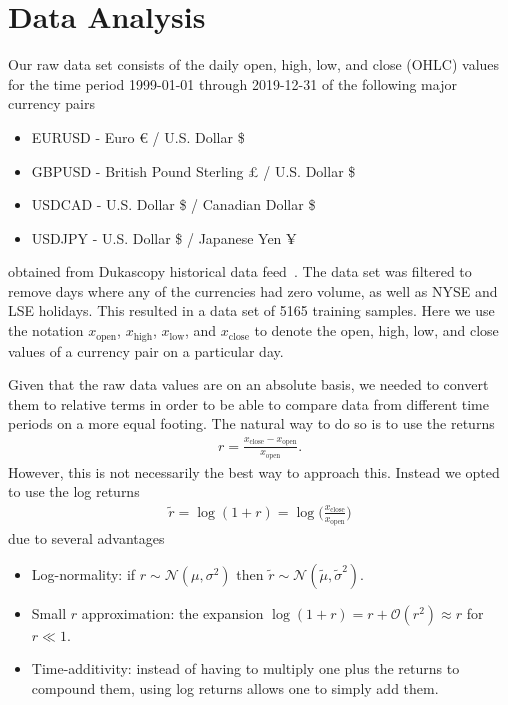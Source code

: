 \section{Data Analysis}
Our raw data set consists of the daily open, high, low, and close (OHLC) values for the time period 1999-01-01 through 2019-12-31 of the following major currency pairs
\begin{itemize}
    \item EURUSD - Euro € / U.S. Dollar \$
    \item GBPUSD - British Pound Sterling £ / U.S. Dollar \$
    \item USDCAD - U.S. Dollar \$ / Canadian Dollar \$
    \item USDJPY - U.S. Dollar \$ / Japanese Yen ¥
\end{itemize}
obtained from Dukascopy historical data feed~\cite{dukascopy}.
The data set was filtered to remove days where any of the currencies had zero volume, as well as NYSE and LSE holidays.
This resulted in a data set of 5165 training samples.
Here we use the notation \( x_\text{open} \), \( x_\text{high} \), \( x_\text{low} \), and \( x_\text{close} \) to denote the open, high, low, and close values of a currency pair on a particular day.

Given that the raw data values are on an absolute basis, we needed to convert them to relative terms in order to be able to compare data from different time periods on a more equal footing.
The natural way to do so is to use the returns
\begin{align}
    r = \frac{x_\text{close} - x_\text{open}}{x_\text{open}}.
\end{align}
However, this is not necessarily the best way to approach this.
Instead we opted to use the log returns
\begin{align}
    \tilde{r}
        = \log(1+r)
        = \log\bigg( \frac{x_\text{close}}{x_\text{open}} \bigg)
\end{align}
due to several advantages~\cite{quantivity_2012}
\begin{itemize}
    \item Log-normality: if \( r \sim \mathcal{N}(\mu, \sigma^2) \) then \( \tilde{r} \sim \mathcal{N}(\tilde{\mu}, \tilde{\sigma}^2) \).
    \item Small \( r \) approximation: the expansion \( \log (1 + r) = r + \mathcal{O}(r^2) \approx r \) for \( r \ll 1 \).
    \item Time-additivity: instead of having to multiply one plus the returns to compound them, using log returns allows one to simply add them.
\end{itemize}

